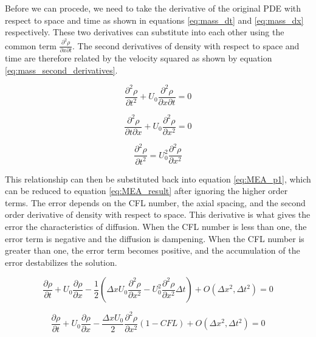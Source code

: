    Before we can procede, we need to take the derivative of the original PDE with respect
    to space and time as shown in equations \ref{eq:mass_dt} and  \ref{eq:mass_dx} 
    respectively. These two derivatives can substitute into each other using the common 
    term $\frac{\partial^2 \rho}{\partial x \partial t}$. The second derivatives of density with 
    respect to space and time are therefore related by the velocity squared as
    shown by equation \ref{eq:mass_second_derivatives}.
    
    \begin{equation}
    \label{eq:mass_dt}
    	 \frac{\partial^2 \rho}{\partial t^2} + U_{0} \frac{\partial^2 \rho}{\partial x \partial t} = 0
    \end{equation}
    
    \begin{equation}
    \label{eq:mass_dx}
    	 \frac{\partial^2 \rho}{\partial t \partial x} + U_{0} \frac{\partial^2 \rho}{\partial x^2} = 0
    \end{equation}
    
    \begin{equation}
    \label{eq:mass_second_derivatives}
    	 \frac{\partial^2 \rho}{\partial t^2} =  U_{0}^2 \frac{\partial^2 \rho}{\partial x^2}
    \end{equation} \linebreak
    
    This relationship can then be substituted back into equation \ref{eq:MEA_p1}, 
    which can be reduced to equation \ref{eq:MEA_result} after ignoring the higher
    order terms. The error depends on the CFL number, the axial spacing, and the
    second order derivative of density with respect to space. This derivative is
    what gives the error the characteristics of diffusion. When the CFL number
    is less than one, the error term is negative and the diffusion is dampening. When
    the CFL number is greater than one, the error term becomes positive, and the
    accumulation of the error destabilizes the solution. 
    
    \begin{equation}
    	 \frac{\partial \rho}{\partial t}  +  U_{0} \frac{\partial \rho}{\partial x} - 
    	  \frac{1}{2}  \left(  \Delta x U_{0} \frac{\partial^2 \rho}{\partial
    	  x^2} -   U_{0}^2 \frac{\partial^2 \rho}{\partial x^2} \Delta t  \right) 
    	   + O(\Delta x^{2},\Delta t^{2}) = 0
    \end{equation}
    
    \begin{equation}
    \label{eq:MEA_result}
    	 \frac{\partial \rho}{\partial t}  +  U_{0} \frac{\partial \rho}{\partial x} - 
    	 \frac{\Delta x U_{0}}{2} \frac{\partial^2 \rho}{\partial x^2}  
    	 \left(  1 - CFL  \right) 
    	 + O(\Delta x^{2},\Delta t^{2})  = 0
    \end{equation}
    

